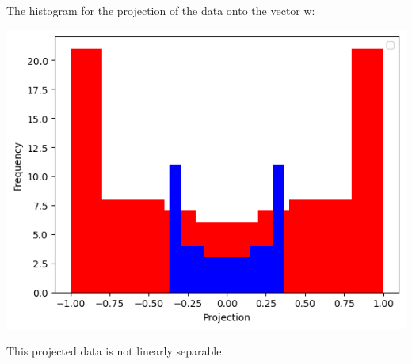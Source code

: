 \documentclass[12pt]{article}
\begin{document}
\begin{enumerate}
    \bigskip
    The histogram for the projection of the data onto the vector w:
    \begin{center}
        \includegraphics{img/oracle.png}
    \end{center}
    This projected data is not linearly separable.


\end{enumerate}
\end{document}
